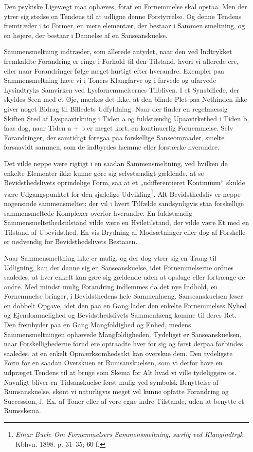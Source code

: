 \documentclass[12pt,a4paper]{book}
\newcommand{\opage}[1]{\marginnote{\footnotesize\textit{[#1]}}}
\newcommand{\apage}[1]{\marginnote{\footnotesize\textit{[#1]}}}
\begin{document}
Den psykiske Ligevægt maa ophæves, forat en Fornemmelse skal opstaa. Men
der ytrer sig stedse en Tendens til at udligne denne Forstyrrelse. Og
denne Tendens fremtræder i to Former, en mere elementær, der bestaar i
Sammen%
\opage{45}smeltning, og en højere, der bestaar i Dannelse af en
Sanseanskuelse.

Sammensmeltning indtræder, som allerede antydet, naar den ved Indtrykket
fremkaldte Forandring er ringe i Forhold til den Tilstand, hvori vi
allerede ere, eller naar Forandringer følge meget hurtigt efter
hverandre. Exempler paa Sammensmeltning have vi i Toners Klangfarve og i
farvede og ufarvede Lysindtryks Samvirken ved Lysfornemmelsernes
Tilbliven. I et Synsbillede, der skyldes Seen med et Øje, mærkes det
ikke, at den blinde Plet paa Nethinden ikke giver noget Bidrag til
Billedets Udfyldning. Naar der finder en regelmæssig Skiften Sted af
Lyspaavirkning i Tiden a og fuldstændig Upaavirkethed i Tiden b, faas
dog, naar Tiden a + b er meget kort, en kontinuerlig Fornemmelse. Selv
Forandringer, der samtidigt foregaa paa forskellige Sanseomraader, smelte
forsaavidt sammen, som de indbyrdes hæmme eller forstærke hverandre.

Det vilde neppe være rigtigt i en saadan Sammensmeltning, ved hvilken de
enkelte Elementer ikke kunne gøre sig selvstændigt gældende, at se
Bevidsthedslivets oprindelige Form, saa at et „udifferentieret
Kontinuum“ skulde være Udgangspunktet for den sjælelige
Udvikling\footnote{\emph{Einar Buch}: \emph{Om Fornemmelsers
Sammensmeltning, særlig ved Klangindtryk}. Kbhvn. 1898. p. 31--35;
60 f.}. Alt Bevidsthedsliv er neppe nogensinde sammensmeltet; der vil i
hvert Tilfælde sandsynligvis staa forskellige sammensmeltede Komplexer
overfor hverandre. En fuldstændig Sammensmeltethedstilstand vilde være en
Hviletilstand, der vilde være Et med en Tilstand af Ubevidsthed. En vis
Brydning af Modsætninger eller dog af Forskelle er nødvendig for
Bevidsthedslivets Bestaaen.

Naar Sammensmeltning ikke er mulig, og der dog ytrer sig en Trang til
Udligning, kan der danne sig en Sanseanskuelse, idet Fornemmelserne
ordnes saaledes, at hver enkelt kan gøre sig gældende uden at opsluge
eller fortrænge de andre. Med mindst mulig Forandring indlemmes da det
nye Indhold, en Fornemmelse bringer, i Bevidsthedens \apage{46} hele Sammenhæng.
Sanseanskuelsen løser en dobbelt Opgave, idet den paa en Gang lader den
enkelte Fornemmelses Nyhed og Ejendommelighed og Bevidsthedslivets
Sammenhæng komme til deres Ret. Den frembyder paa en Gang Mangfoldighed
og Enhed, medens Sammensmeltningen ophævede Mangfoldigheden. Tydeligst
er Sanseanskuelsen, naar Forskellighederne forud ere optraadte hver for
sig og først derpaa forbindes saaledes, at en enkelt Opmærksomhedsakt
kan overskue dem. Den tydeligste Form for en saadan Overskuen er
Rumsanskuelsen, som vi derfor have en udpræget Tendens til at bruge som
Skema for Alt hvad vi ville tydeliggøre os. Navnligt bliver en
Tidsanskuelse først mulig ved symbolsk Benyttelse af Rumsanskuelse,
skønt vi naturligvis meget vel kunne opfatte Forandring og Succession,
f.\ Ex. af Toner eller af vore egne indre Tilstande, uden at benytte et
Rumsskema.
\end{document}
